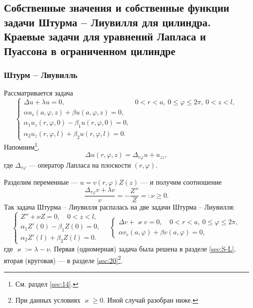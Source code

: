 \subsection{Собственные значения и собственные функции задачи Штурма -- Лиувилля для цилиндра. Краевые задачи для уравнений Лапласа и Пуассона в ограниченном цилиндре}
\subsubsection{Штурм -- Лиувилль}
Рассматривается задача
\[
  \begin{cases}
    \Delta u + \lambda u = 0, & 0 < r < a, \ 0\leqslant \varphi \leqslant 2\pi,
    \ 0 < z < l,\\
    \alpha u_r(a, \varphi, z) + \beta u(a, \varphi, z) = 0,\\
    \alpha_1 u_z(r,\varphi, 0) - \beta_1 u(r,\varphi, 0) = 0,\\
    \alpha_2 u_z(r,\varphi, l) + \beta_2 u(r,\varphi, l) = 0.
  \end{cases}
\]
Напомним\footnote{См. раздел \ref{sec:14}.}, 
\begin{equation}
  \label{eq:laplace_cyl}
  \Delta u(r,\varphi,z) = \Delta_{r\varphi} u + u_{zz},
\end{equation}
где $ \Delta_{r \varphi} $ --- оператор Лапласа на плоскости $ (r, \varphi) $.

Разделим переменные --- $ u = v(r, \varphi) Z(z) $ --- и получим соотношение 
\[
  \frac{\Delta_{r\varphi} v + \lambda v}{v} = - \frac{Z''}{Z} =: \nu \geqslant 0.
\]
Так задача Штурма -- Лиувилля распалась на две задачи Штурма -- Лиувилля: 
\[
  \begin{cases}
    Z'' + \nu Z = 0, \quad 0 < z < l,\\
    \alpha_1Z'(0) -\beta_1 Z(0) = 0,\\
    \alpha_2 Z'(l) + \beta_2 Z(l) = 0.
  \end{cases}\quad
  \begin{cases}
    \Delta v + \varkappa v = 0, \quad 0 < r < a, \ 0 \leqslant \varphi \leqslant
    2\pi,\\
    \alpha v_r(a,\varphi) + \beta v(a,\varphi) = 0,
  \end{cases}
\] %
где $ \varkappa := \lambda - \nu $. Первая (одномерная) задача была решена в
разделе \ref{sec:S-L}, вторая (круговая) --- в разделе \ref{sec:20}\footnote{При
данных условиях $ \varkappa \geqslant 0 $. Иной случай
разобран ниже.}. 

